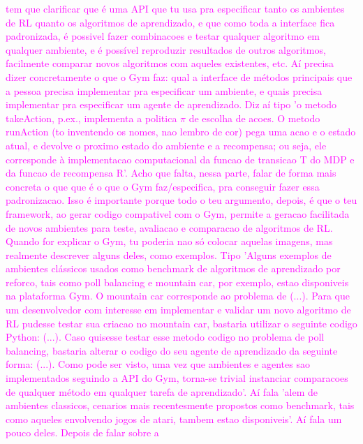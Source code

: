 \documentclass[cic,tc]{iiufrgs}
\newcommand\bruno[1]{\textcolor{magenta}{#1}}
\begin{document}
\bruno{tem que clarificar que é uma API que tu usa pra especificar tanto os
ambientes de RL quanto os algoritmos de aprendizado, e que como toda a interface
 fica padronizada, é possivel fazer combinacoes e testar qualquer algoritmo em
  qualquer ambiente, e é possível reproduzir resultados de outros algoritmos,
  facilmente comparar novos algoritmos com aqueles existentes, etc. Aí precisa
  dizer concretamente o que o Gym faz: qual a interface de métodos principais
  que a pessoa precisa implementar pra especificar um ambiente, e quais precisa
   implementar pra especificar um agente de aprendizado. Diz aí tipo 'o metodo
   takeAction, p.ex., implementa a politica $\pi$ de escolha de acoes. O metodo
   runAction (to inventendo os nomes, nao lembro de cor) pega uma acao e o
    estado atual, e devolve o proximo estado do ambiente e a recompensa; ou
    seja, ele corresponde à implementacao computacional da funcao de transicao
    T do MDP e da funcao de recompensa R'. Acho que falta, nessa parte, falar
    de forma mais concreta o que que é o que o Gym faz/especifica, pra conseguir
     fazer essa padronizacao. Isso é importante porque todo o teu argumento,
     depois, é que o teu framework, ao gerar codigo compativel com o Gym,
     permite a geracao facilitada de novos ambientes para teste, avaliacao
      e comparacao de algoritmos de RL. Quando for explicar o Gym, tu poderia
      nao só colocar aquelas imagens, mas realmente descrever alguns deles,
      como exemplos. Tipo 'Alguns exemplos de ambientes clássicos usados
      como benchmark de algoritmos de aprendizado por reforco, tais como
      poll balancing e mountain car, por exemplo, estao disponiveis na
      plataforma Gym. O mountain car corresponde ao problema de (...).
      Para que um desenvolvedor com interesse em implementar e validar
       um novo algoritmo de RL pudesse testar sua criacao no mountain
       car, bastaria utilizar o seguinte codigo Python: (...).
       Caso quisesse testar esse metodo codigo no problema de poll
       balancing, bastaria alterar o codigo do seu agente de aprendizado
        da seguinte forma: (...). Como pode ser visto, uma vez que
         ambientes e agentes sao implementados seguindo a API do Gym,
          torna-se trivial instanciar comparacoes de qualquer método em
          qualquer tarefa de aprendizado'. Aí fala 'alem de ambientes
          classicos, cenarios mais recentesmente propostos como benchmark,
          tais como aqueles envolvendo jogos de atari, tambem estao
           disponiveis'. Aí fala um pouco deles. Depois de falar sobre a
}
\end{document}
